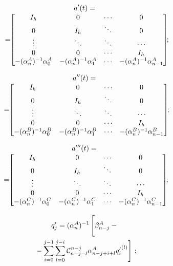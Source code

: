 \begin{multicols}{2}
\noindent
\begin{multline}
a'(t) ={}\\[-3pt]
\hspace*{-2mm}{}=\!\!\begin{bmatrix}
    I_h&0&\cdots&0\\
    0&I_h&\ddots&0\\
    \vdots&\ddots&\ddots&\cdots\\
    0&0&\cdots&I_h\\
    -(\alp_n^A)^{-1}\alp_0^A& -(\alp_n^A)^{-1}\alp_1^A&\cdots&-(\alp_n^A)^{-1} \alp_{n-1}^A
    \end{bmatrix}\!\!;\!\!\!\!
    \end{multline}

 \vspace*{-13pt}

\noindent
\begin{multline}
a''(t) ={}\\[-3pt]
\hspace*{-1.5mm}{}=\!\!\begin{bmatrix}
    I_h&0&\cdots&0\\
    0&I_h&\ddots&0\\
    \vdots&\ddots&\ddots&\cdots\\
    0&0&\cdots&I_h\\
    -(\alp_n^B)^{-1}\alp_0^B& -(\alp_n^B)^{-1}\alp_1^B&\cdots&-(\alp_n^B)^{-1}\alp_{n-1}^B
    \end{bmatrix}\!\!;\!\!\!
    \end{multline}

 \vspace*{-13pt}

\noindent
\begin{multline}
a'''(t) ={}\\[-3pt]
\hspace*{-2mm}{}=\!\!\begin{bmatrix}
    I_h&0&\cdots&0\\
    0&I_h&\ddots&0\\
    \vdots&\ddots&\ddots&\cdots\\
    0&0&\cdots&I_h\\
    -(\alp_n^C)^{-1}\alp_0^C& -(\alp_n^C)^{-1}\alp_1^C&\cdots&-(\alp_n^C)^{-1}\alp_{n-1}^C
    \end{bmatrix}\!\!;\!\!\!
    \label{e4.17-s}
    \end{multline}

 \vspace*{-12pt}

\noindent
\begin{multline}
    q_j' = (\alp_n^A)^{-1} \left[
    \vphantom{    \sss_{l=0}^{j-i}}
    \beta_{n-j}^A -{}\right.\\
\left.    {}-\sss_{i=0}^{j-1}
    \sss_{l=0}^{j-i} {\cal C}_{n-j-l}^{n-j} \alp_{n-j+i+l}^A {q_i'}^{(l)}\right]\,;
\end{multline}


\end{multicols}
